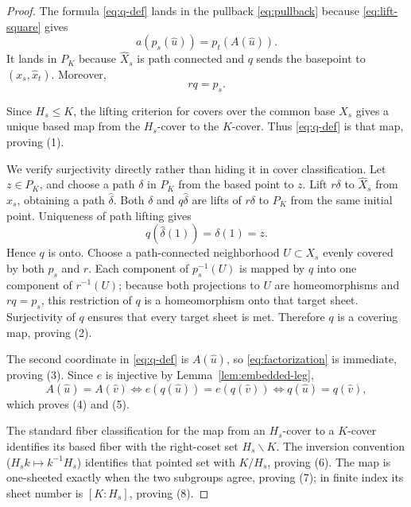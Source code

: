 \begin{proof}
The formula \eqref{eq:q-def} lands in the pullback \eqref{eq:pullback} because \eqref{eq:lift-square} gives
\[
  a(p_s(\widehat u))=p_t(A(\widehat u)).
\]
It lands in \( P_K \) because \( \widehat X_s \) is path connected and \( q \) sends the basepoint to \( (x_s,\widehat x_t) \).  Moreover,
\begin{equation}\label{eq:rq}
  r q = p_s .
\end{equation}

Since \( H_s\leq K \), the lifting criterion for covers over the common base \( X_s \) gives a unique based map from the \( H_s \)-cover to the \( K \)-cover.  Thus \eqref{eq:q-def} is that map, proving (1).

We verify surjectivity directly rather than hiding it in cover classification.  Let \( z\in P_K \), and choose a path \( \delta \) in \( P_K \) from the based point to \( z \).  Lift \( r\delta \) to \( \widehat X_s \) from \( \widehat x_s \), obtaining a path \( \widehat\delta \).  Both \( \delta \) and \( q\widehat\delta \) are lifts of \( r\delta \) to \( P_K \) from the same initial point.  Uniqueness of path lifting gives
\[
  q(\widehat\delta(1))=\delta(1)=z .
\]
Hence \( q \) is onto.  Choose a path-connected neighborhood \( U\subset X_s \) evenly covered by both \( p_s \) and \( r \).  Each component of \( p_s^{-1}(U) \) is mapped by \( q \) into one component of \( r^{-1}(U) \); because both projections to \( U \) are homeomorphisms and \( rq=p_s \), this restriction of \( q \) is a homeomorphism onto that target sheet.  Surjectivity of \( q \) ensures that every target sheet is met.  Therefore \( q \) is a covering map, proving (2).

The second coordinate in \eqref{eq:q-def} is \( A(\widehat u) \), so \eqref{eq:factorization} is immediate, proving (3).  Since \( e \) is injective by Lemma~\ref{lem:embedded-leg},
\[
  A(\widehat u)=A(\widehat v)
  \iff
  e(q(\widehat u))=e(q(\widehat v))
  \iff
  q(\widehat u)=q(\widehat v),
\]
which proves (4) and (5).

The standard fiber classification for the map from an \( H_s \)-cover to a \( K \)-cover identifies its based fiber with the right-coset set \( H_s\backslash K \).  The inversion convention (\( H_sk\mapsto k^{-1}H_s \)) identifies that pointed set with \( K/H_s \), proving (6).  The map is one-sheeted exactly when the two subgroups agree, proving (7); in finite index its sheet number is \( [K:H_s] \), proving (8).
\end{proof}